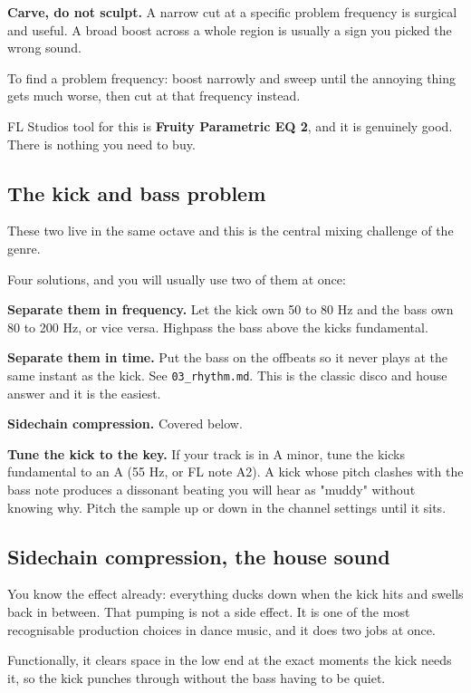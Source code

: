 \textbf{Carve, do not sculpt.} A narrow cut at a specific problem frequency is surgical and
useful. A broad boost across a whole region is usually a sign you picked the wrong sound.

To find a problem frequency: boost narrowly and sweep until the annoying thing gets much
worse, then cut at that frequency instead.

FL Studio\textquotesingle s tool for this is \textbf{Fruity Parametric EQ 2}, and it is genuinely good. There is
nothing you need to buy.

\subsection{The kick and bass problem}\label{th07_mixing-the-kick-and-bass-problem}

These two live in the same octave and this is the central mixing challenge of the genre.

Four solutions, and you will usually use two of them at once:

\textbf{Separate them in frequency.} Let the kick own 50 to 80 Hz and the bass own 80 to 200 Hz,
or vice versa. Highpass the bass above the kick\textquotesingle s fundamental.

\textbf{Separate them in time.} Put the bass on the offbeats so it never plays at the same
instant as the kick. See \texttt{03\_rhythm.md}. This is the classic disco and house answer and it
is the easiest.

\textbf{Sidechain compression.} Covered below.

\textbf{Tune the kick to the key.} If your track is in A minor, tune the kick\textquotesingle s fundamental to
an A (55 Hz, or FL note A2). A kick whose pitch clashes with the bass note produces a
dissonant beating you will hear as "muddy" without knowing why. Pitch the sample up or down
in the channel settings until it sits.

\subsection{Sidechain compression, the house sound}\label{th07_mixing-sidechain-compression-the-house-sound}

You know the effect already: everything ducks down when the kick hits and swells back in
between. That pumping is not a side effect. It is one of the most recognisable production
choices in dance music, and it does two jobs at once.

Functionally, it clears space in the low end at the exact moments the kick needs it, so the
kick punches through without the bass having to be quiet.

